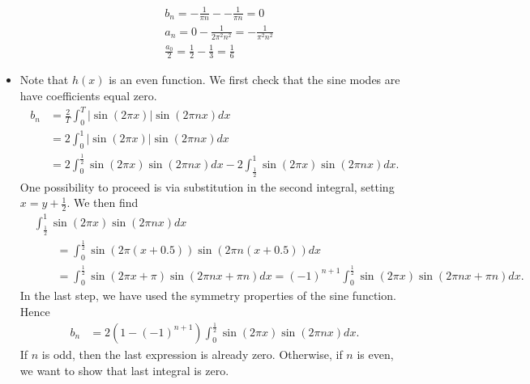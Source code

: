 \documentclass[11pt]{article}
\begin{document}
\begin{solution}
\begin{itemize}
\begin{align*}
                    &b_n = -\frac{1}{\pi n} - - \frac{1}{\pi n} = 0
                    \\& 
            a_n = 0 - \frac{1}{2\pi^2 n^2} =  - \frac{1}{\pi^2 n^2} 
                    \\&
            \frac{a_0}{2} = \frac{1}{2} - \frac{1}{3} = \frac{1}{6}
        \end{align*}	
        \item
        Note that $h(x)$ is an even function.
        We first check that the sine modes are have coefficients equal zero.
        \begin{align*}
            b_n 
            &
            = 
            \frac{2}{T}
            \int_{0}^{T} |\sin( 2\pi x)| \sin(2\pi n x) dx
            \\&
            =
            2
            \int_{0}^{1} |\sin( 2\pi x)| \sin(2\pi n x) dx
            \\&
            =
            2
            \int_{0}^{\frac 1 2} \sin( 2\pi x) \sin(2\pi n x) dx
            -
            2
            \int_{\frac 1 2}^{1} \sin( 2\pi x) \sin(2\pi n x) dx
            .            
        \end{align*}
        One possibility to proceed is via substitution in the second integral, setting $x = y + \frac 1 2$. 
        We then find 
        \begin{align*}
            &
            \int_{\frac 1 2}^{1} 
            \sin( 2\pi x) \sin(2\pi n x) dx
            \\&\qquad 
            =
            \int_{0}^{\frac 1 2} 
            \sin( 2\pi (x+ 0.5)) \sin(2\pi n (x+ 0.5)) dx
            \\&\qquad 
            =
            \int_{0}^{\frac 1 2} 
            \sin( 2\pi x + \pi ) \sin(2\pi n x + \pi n) dx
            =
            (-1)^{n+1}
            \int_{0}^{\frac 1 2} 
            \sin( 2\pi x ) \sin(2\pi n x + \pi n) dx
            .
        \end{align*}
        In the last step, we have used the symmetry properties of the sine function. 
        Hence 
        \begin{align*}
            b_n 
            &
            =
            2 \left( 1 - (-1)^{n+1} \right)
            \int_{0}^{\frac 1 2} \sin( 2\pi x) \sin(2\pi n x) dx
            .
        \end{align*}
        If $n$ is odd, then the last expression is already zero. 
        Otherwise, if $n$ is even, we want to show that last integral is zero. 

\end{itemize}
\end{solution}
\end{document}
